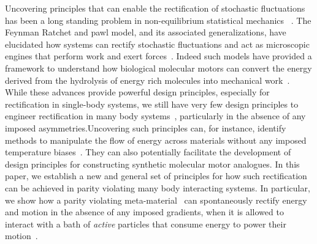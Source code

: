 \documentclass[
 preprint,
 preprintnumbers,
 amsmath,amssymb,
 aps,
 pre,
 longbibliography,
 superscriptaddress,
 10pt, twocolumn
]{revtex4-1}
\begin{document}

Uncovering principles that can enable the rectification of stochastic fluctuations has been a long standing problem in non-equilibrium statistical mechanics ~\cite{Seifert2012StochasticThermodynamics,Coskun2011GreatExpectations}. The Feynman Ratchet and pawl model, and its associated generalizations, have elucidated how systems can rectify stochastic fluctuations and act as microscopic engines that perform work and exert forces~\cite{Jarzynski1999FeynmanRatchet}. Indeed such models have provided a framework to understand how biological molecular motors can convert the energy derived from the hydrolysis of energy rich molecules into mechanical work~\cite{Mogilner1996CellMotility,Chernyak2008PumpingRestriction,Rahav2008DirectedFlow,Sinitsyn2007UniversalGeometric}. While these advances provide powerful design principles, especially for rectification in single-body systems, we still have very few design principles to engineer rectification in many body systems~\cite{Seifert2012StochasticThermodynamics}, particularly in the absence of any imposed asymmetries.Uncovering such principles can, for instance, identify methods to manipulate the flow of energy across materials without any imposed temperature biases~\cite{Dubi2011ColloquiumHeat,Strohm2005PhenomenologicalEvidence,Li2012ColloquiumPhononics,Kanazawa2013HeatConduction,Morgado2016ThermostatisticsSmall,Martinez2017ColloidalHeat}. They can also potentially facilitate the development of design principles for constructing synthetic molecular motor analogues. In this paper, we establish a new and general set of principles for how such rectification can be achieved in parity violating many body interacting systems. In particular, we show how a parity violating meta-material~\cite{Nash2015TopologicalMechanics} can spontaneously rectify energy and motion in the absence of any imposed gradients, when it is allowed to interact with a bath of \textit{active} particles that consume energy to power their motion~\cite{Marchetti2013HydrodynamicsSoft,Souslov2017TopologicalSound,Shankar2017TopologicalSound}. 

\end{document}
